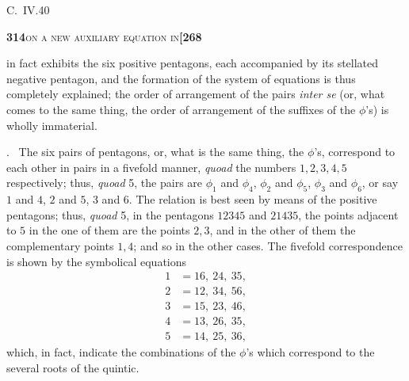 \documentclass[11pt]{article}
\begin{document}
\hfill C.~IV.\hfill 40

\newpage
\setcounter{page}{314}

\noindent\textbf{314}\hfill\textsc{on a new auxiliary equation in}\hfill\textbf{[268}

\medskip

\noindent in fact exhibits the six positive pentagons, each accompanied by its stellated negative pentagon, and the formation of the system of equations is thus completely explained; the order of arrangement of the pairs \textit{inter se} (or, what comes to the same thing, the order of arrangement of the suffixes of the $\phi$'s) is wholly immaterial.

\medskip

. \ The six pairs of pentagons, or, what is the same thing, the $\phi$'s, correspond to each other in pairs in a fivefold manner, \textit{quoad} the numbers $1, 2, 3, 4, 5$ respectively; thus, \textit{quoad} 5, the pairs are $\phi_1$ and $\phi_4$, $\phi_2$ and $\phi_5$, $\phi_3$ and $\phi_6$, or say $1$ and $4$, $2$ and $5$, $3$ and $6$. The relation is best seen by means of the positive pentagons; thus, \textit{quoad} 5, in the pentagons $12345$ and $21435$, the points adjacent to $5$ in the one of them are the points $2, 3$, and in the other of them the complementary points $1, 4$; and so in the other cases. The fivefold correspondence is shown by the symbolical equations
\[
\begin{aligned}
   1 &= 16,\ 24,\ 35,\\
   2 &= 12,\ 34,\ 56,\\
   3 &= 15,\ 23,\ 46,\\
   4 &= 13,\ 26,\ 35,\\
   5 &= 14,\ 25,\ 36,
\end{aligned}
\]
which, in fact, indicate the combinations of the $\phi$'s which correspond to the several roots of the quintic.

\medskip
\end{document}
